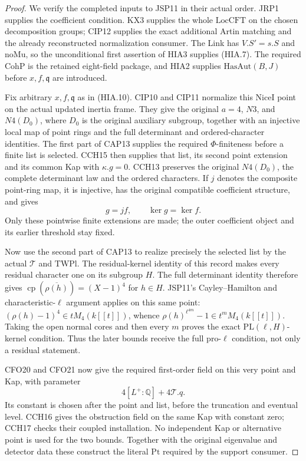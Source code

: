 \documentclass[11pt,a4paper]{article}
\numberwithin{equation}{section}
\theoremstyle{remark}\newtheorem{remark}[theorem]{Remark}
\begin{document}
\begin{proof}
We verify the completed inputs to JSP11 in their actual order.
JRP1 supplies the coefficient condition.  KX3 supplies the
whole \(\mathrm{LocCFT}\) on the chosen decomposition
groups; CIP12 supplies the exact additional Artin matching
and the already reconstructed normalization consumer.
The Link has \(V.S'=s.S\) and \(\mathrm{noMu}\), so the
unconditional first assertion of HIA3 supplies (HIA.7).
The required \(\mathrm{CohP}\) is the retained eight-field
package, and HIA2 supplies \(\mathrm{HasAut}(B,J)\)
before \(x,f,\mathfrak q\) are introduced.

Fix arbitrary \(x,f,\mathfrak q\) as in (HIA.10).
CIP10 and CIP11 normalize this \(\mathrm{NiceI}\) point
on the actual updated inertia frame.  They give the original
\(a=4\), \(N3\), and \(N4(D_0)\), where \(D_0\)
is the original auxiliary subgroup, together with an
injective local map of point rings and the full determinant
and ordered-character identities.  The first part of CAP13
supplies the required \(\Phi\)-finiteness before a finite
list is selected.  CCH15 then supplies that list, its second
point extension and its common Kap with \(\kappa.g=0\).
CCH13 preserves the original \(N4(D_0)\), the complete
determinant law and the ordered characters.  If \(j\)
denotes the composite point-ring map, it is injective, has
the original compatible coefficient structure, and gives
\[
                             g=jf,\qquad\ker g=\ker f.
 \tag{HIA.11}
\]
Only these pointwise finite extensions are made; the outer
coefficient object and its earlier threshold stay fixed.

Now use the second part of CAP13 to realize precisely the
selected list by the actual \(\mathcal T\) and
\(\mathrm{TWPl}\).  The residual-kernel identity of this
record makes every residual character one on its subgroup
\(H\).  The full determinant identity therefore gives
\(\operatorname{cp}(\overline{\rho(h)})=(X-1)^4\)
for \(h\in H\).  JSP11's Cayley--Hamilton and
characteristic-\(\ell\) argument applies on this same
point: \((\rho(h)-1)^4\in tM_4(k[[t]])\), whence
\(\rho(h)^{\ell^{4m}}-1\in t^mM_4(k[[t]])\).
Taking the open normal cores and then every \(m\)
proves the exact \(\mathrm{PL}(\ell,H)\)-kernel
condition.  Thus the later bounds receive the full pro-\(\ell\)
condition, not only a residual statement.

CFO20 and CFO21 now give the required first-order field
on this very point and Kap, with parameter
\[
                            4[L^+:\mathbb Q]+4\mathcal T.q.
 \tag{HIA.12}
\]
Its constant is chosen after the point and list, before
the truncation and eventual level.  CCH16 gives the
obstruction field on the same Kap with constant zero;
CCH17 checks their coupled installation.  No independent
Kap or alternative point is used for the two bounds.
Together with the original eigenvalue and detector data
these construct the literal \(\mathrm{Pt}\) required
by the support consumer.


\end{proof}
\end{document}
